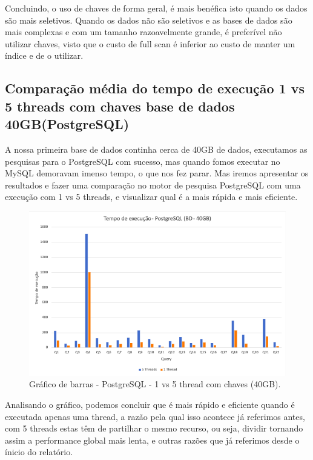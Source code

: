 \documentclass{article}
\begin{document}
Concluindo, o uso de chaves de forma geral, é mais benéfica isto quando os dados são mais seletivos. Quando os dados não são seletivos e as bases de dados são mais complexas e com um tamanho razoavelmente grande, é preferível não utilizar chaves, visto que o custo de full scan é inferior ao custo de manter um índice e de o utilizar.
\clearpage
\subsection{Comparação média do tempo de execução 1 vs 5 threads com chaves base de dados 40GB(PostgreSQL)}

\texttt{}\par A nossa primeira base de dados continha cerca de 40GB de dados, executamos as pesquisas para o PostgreSQL com sucesso, mas quando fomos executar no MySQL demoravam imenso tempo, o que nos fez parar. Mas iremos apresentar os resultados e fazer uma comparação no motor de pesquisa PostgreSQL com uma execução com 1 vs 5 threads, e visualizar qual é a mais rápida e mais eficiente.

\begin{figure}[H]
  \centering
  \includegraphics[width=\textwidth]{Graphs/postgresql40gb.png}
  \caption{Gráfico de barras - PostgreSQL - 1 vs 5 thread com chaves (40GB).} 
  \label{fig:PKCreation2}
\end{figure}

Analisando o gráfico, podemos concluir que é mais rápido e eficiente quando é executada apenas uma thread, a razão pela qual isso acontece já referimos antes, com 5 threads estas têm de partilhar o mesmo recurso, ou seja, dividir tornando assim a performance global mais lenta, e outras razões que já referimos desde o ínicio do relatório. 
\end{document}
